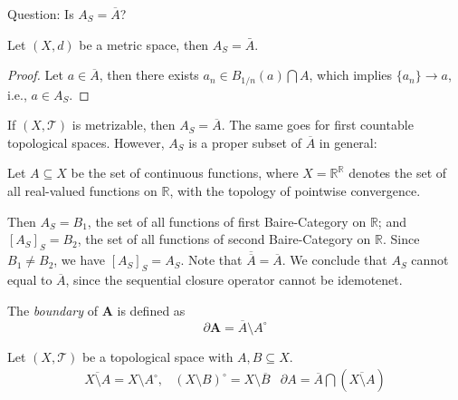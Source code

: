 Question: Is $A_S=\overline{A}$?

\begin{proposition}
Let $(X,d)$ be a metric space, then $A_S=\bar{A}$.
\end{proposition}

\begin{proof}
Let $a\in\overline{A}$, 
then there exists $a_n\in B_{1/n}(a)\bigcap A$, 
which implies $\{a_n\}\to a$, i.e., 
$a\in A_S$.
\end{proof}

\begin{remark}
If $(X,\mathcal{T})$ is metrizable, then $A_S=\overline A$. 
The same goes for first countable topological spaces.
However, $A_S$ is a proper subset of $\overline{A}$ in general:

Let $A\subseteq X$ be the set of continuous functions, where $X=\mathbb{R}^{\mathbb{R}}$ denotes the set of all real-valued functions on $\mathbb{R}$, with the topology of pointwise convergence.

Then $A_S=B_1$, the set of all functions of first Baire-Category on $\mathbb{R}$; and $[A_S]_S=B_2$, the set of all functions of second Baire-Category on $\mathbb{R}$. Since $B_1\ne B_2$, we have $[A_S]_S=A_S$. Note that $\overline{\overline{A}}=\overline{A}$. We conclude that $A_S$ cannot equal to $\overline{A}$, since the sequential closure operator cannot be idemotenet.
\end{remark}

\begin{definition}[Boundary]
The \emph{boundary} of $\bm A$ is defined as
\[
\partial\bm A=\overline{A}\setminus A^\circ
\]
\end{definition}

\begin{proposition}
Let $(X,\mathcal{T})$ be a topological space with $A,B\subseteq X$.
\[
\begin{array}{lll}
\overline{X\setminus A}=X\setminus A^\circ,
&
(X\setminus B)^\circ = X\setminus\overline{B}&
\partial A=\overline{A}\bigcap(\overline{X\setminus A})
\end{array}
\]
\end{proposition}

